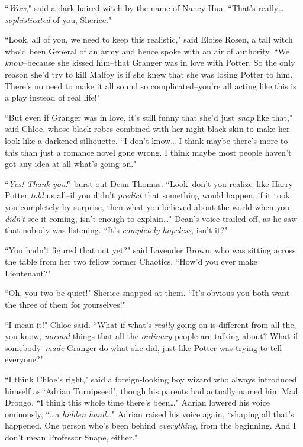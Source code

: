 ``\emph{Wow}," said a dark-haired witch by the name of Nancy Hua. ``That's really{\ldots} \emph{sophisticated} of you, Sherice."

``Look, all of you, we need to keep this realistic," said Eloise Rosen, a tall witch who'd been General of an army and hence spoke with an air of authority. ``We \emph{know}\---because she kissed him\---that Granger was in love with Potter. So the only reason she'd try to kill Malfoy is if she knew that she was losing Potter to him. There's no need to make it all sound so complicated\---you're all acting like this is a play instead of real life!"

``But even if Granger was in love, it's still funny that she'd just \emph{snap} like that," said Chloe, whose black robes combined with her night-black skin to make her look like a darkened silhouette. ``I don't know{\ldots} I think maybe there's more to this than just a romance novel gone wrong. I think maybe most people haven't got any idea at all what's going on."

``\emph{Yes! Thank you!}" burst out Dean Thomas. ``Look\---don't you realize\---like Harry Potter \emph{told} us all\---if you didn't \emph{predict} that something would happen, if it took you completely by surprise, then what you believed about the world when you \emph{didn't} see it coming, isn't enough to explain{\ldots}" Dean's voice trailed off, as he saw that nobody was listening. ``It's \emph{completely hopeless}, isn't it?"

``You hadn't figured that out yet?" said Lavender Brown, who was sitting across the table from her two fellow former Chaotics. ``How'd you ever make Lieutenant?"

``Oh, you two be quiet!" Sherice snapped at them. ``It's obvious you both want the three of them for yourselves!"

``I mean it!" Chloe said. ``What if what's \emph{really} going on is different from all the, you know, \emph{normal} things that all the \emph{ordinary} people are talking about? What if somebody\---\emph{made} Granger do what she did, just like Potter was trying to tell everyone?"

``I think Chloe's right," said a foreign-looking boy wizard who always introduced himself as `Adrian Turnipseed', though his parents had actually named him Mad Drongo. ``I think this whole time there's been{\ldots}" Adrian lowered his voice ominously, ``{\ldots}a \emph{hidden hand}{\ldots}" Adrian raised his voice again, ``shaping all that's happened. One person who's been behind \emph{everything}, from the beginning. And I don't mean Professor Snape, either."

